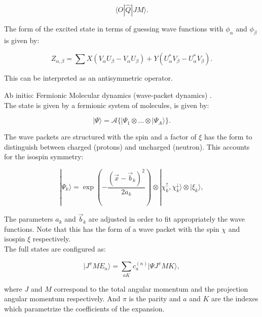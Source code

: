 \documentclass[openany]{book}
\begin{document}
\begin{equation}\label{eq:micro_QHFB_quadrupole}
	\langle  O | \hat Q|  JM \rangle. 
\end{equation}

The form of the excited state in terms of guessing wave functions with $\phi_\alpha$ and $\phi_\beta$ is given by:

\begin{equation}\label{eq:micro_QHFB_densityGround}
	Z_{\alpha, \beta} = \sum {X (V_\alpha U_\beta - V_\alpha U_\beta) + Y (U^{*}_\alpha V_\beta - U^{*}_\alpha V_\beta)}. 
\end{equation}

This can be interpreted as an antisymmetric operator. 

Ab initio: Fermionic Molecular dynamics (wave-packet dynamics) \cite{neff_feldmeier_langanke_2011}. \\

The state is given by a fermionic system of molecules, is given by: 

\begin{equation}\label{eq:micro_FMD_state}
	| \Psi \rangle = \mathcal{A} \{ |\Psi_1 \otimes ... \otimes |\Psi_A \rangle \}.
\end{equation}

The wave packets are structured with the spin and a factor of $\xi$ has the form to distinguish between charged (protons) and uncharged (neutron). This accounts for the isospin symmetry:

\begin{equation} \label{eq:micro_FMD_wavePacket}
	|\Psi_k \rangle = \exp {\left ( - \frac{(\vec x - \vec b_k)^2}{2a_k} \right)} \otimes |\chi^{\uparrow}_k,  \chi^{\downarrow}_k \rangle \otimes |\xi_k \rangle, 
\end{equation}

The parameters $a_k$ and $\vec b_k$ are adjusted in order to fit appropriately the wave functions. Note that this has the form of a wave packet with the spin  $\chi$ and isospin  $\xi$ respectively. \\


The full states are configured as: 

\begin{equation} \label{eq:micro_FMD_generalState}
	| J^{\pi} M E_n \rangle = \sum_{aK}{c^{(n)}_a | \Psi J^\pi MK \rangle} , 
\end{equation}

where $J$ and $M$ correspond to the total angular momentum and the projection angular momentum respectively. And $\pi$ is the parity and $a$ and $K$ are the indexes which parametrize the coefficients of the expansion.  \\
\end{document}
